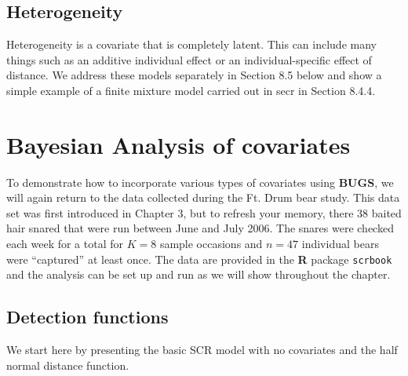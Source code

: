 \subsection{Heterogeneity} 
Heterogeneity is a covariate that is completely latent.   This can include many things such as an additive individual effect or an individual-specific effect of distance.  We address these models separately in Section 8.5 below and show a simple example of a finite mixture model carried out in secr in Section 8.4.4.


\section{Bayesian Analysis of covariates}

To demonstrate how to incorporate various types of covariates using {\bf BUGS}, we will again return to the data collected during the Ft. Drum bear study.    This data set was first introduced in Chapter 3, but to refresh your memory, there 38 baited hair snared that were run between June and July 2006.  The snares were checked each week for a total for $K=8$ sample occasions and $n=47$ individual bears were ``captured'' at least once.  The data are provided in the {\bf R} package \mbox{\tt scrbook} and the analysis can be set up and run as we will show throughout the chapter.

\subsection{Detection functions}

We start here by presenting the basic SCR model with no covariates and the half normal distance function.   

